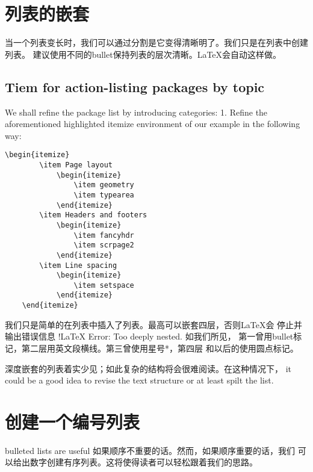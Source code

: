 \section{列表的嵌套}
当一个列表变长时，我们可以通过分割是它变得清晰明了。我们只是在列表中创建列表。
建议使用不同的bullet保持列表的层次清晰。LaTeX会自动这样做。
	\subsection{Tiem for action-listing packages by topic}
We shall refine the package list by introducing categories:
1. Refine the aforementioned highlighted itemize environment of our example
in the following way:
	\begin{lstlisting}[language={[LaTeX]TeX}]
	\begin{itemize}
		\item Page layout
			\begin{itemize}
				\item geometry
				\item typearea
			\end{itemize}
		\item Headers and footers
			\begin{itemize}
				\item fancyhdr
				\item scrpage2
			\end{itemize}
		\item Line spacing
			\begin{itemize}
				\item setspace
			\end{itemize}
	\end{itemize}
	\end{lstlisting}
	我们只是简单的在列表中插入了列表。最高可以嵌套四层，否则LaTeX会
	停止并输出错误信息 !LaTeX Error: Too deeply nested. 如我们所见，
	第一曾用bullet标记，第二层用英文段横线。第三曾使用星号*，第四层
	和以后的使用圆点标记。

	深度嵌套的列表着实少见；如此复杂的结构将会很难阅读。在这种情况下，
	it could be a good idea to revise the text structure or at least
	spilt the list.
\section{创建一个编号列表}
bulleted lists are useful 如果顺序不重要的话。然而，如果顺序重要的话，我们
可以给出数字创建有序列表。这将使得读者可以轻松跟着我们的思路。
